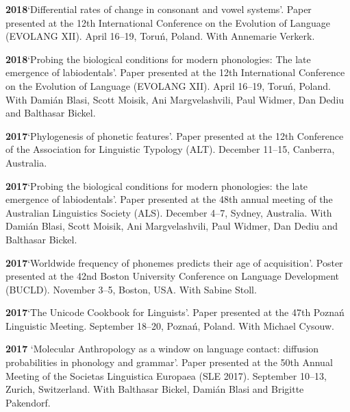 \documentclass[11pt]{article}
\newcommand{\hangpara}{
 \setlength{\parindent}{0in} %
 \hangindent=0.42in %
}
\begin{document}
\vskip 6pt
\hangpara
{\bf 2018}\hspace{1ex}`Differential rates of change in consonant and vowel systems'. Paper presented at the 12th International Conference on the Evolution of Language (EVOLANG XII). April 16--19, Toru{\'n}, Poland. With Annemarie Verkerk. %

\vskip 6pt
\hangpara
{\bf 2018}\hspace{1ex}`Probing the biological conditions for modern phonologies: The late emergence of labiodentals'. Paper presented at the 12th International Conference on the Evolution of Language (EVOLANG XII). April 16--19, Toru{\'n}, Poland. With Dami{\'a}n Blasi, Scott Moisik, Ani Margvelashvili, Paul Widmer, Dan Dediu and Balthasar Bickel.

\vskip 6pt
\hangpara
{\bf 2017}\hspace{1ex}`Phylogenesis of phonetic features'. Paper presented at the 12th Conference of the Association for Linguistic Typology (ALT). December 11--15, Canberra, Australia.

\vskip 6pt
\hangpara
{\bf 2017}\hspace{1ex}`Probing the biological conditions for modern phonologies: the late emergence of labiodentals'. Paper presented at the 48th annual meeting of the Australian Linguistics Society (ALS). December 4--7, Sydney, Australia. With Dami{\'a}n Blasi, Scott Moisik, Ani Margvelashvili, Paul Widmer, Dan Dediu and Balthasar Bickel.

\vskip 6pt
\hangpara
{\bf 2017}\hspace{1ex}`Worldwide frequency of phonemes predicts their age of acquisition'. Poster presented at the 42nd Boston University Conference on Language Development (BUCLD). November 3--5, Boston, USA. With Sabine Stoll.

\vskip 6pt
\hangpara
{\bf 2017}\hspace{1ex}`The Unicode Cookbook for Linguists'. Paper presented at the 47th Pozna{\'n} Linguistic Meeting. September 18--20, Pozna{\'n}, Poland. With Michael Cysouw. 

\vskip 6pt
\hangpara
{\bf 2017}\hspace{1ex} `Molecular Anthropology as a window on language contact: diffusion probabilities in phonology and grammar'. Paper presented at the 50th Annual Meeting of the Societas Linguistica Europaea (SLE 2017). September 10--13, Zurich, Switzerland. With Balthasar Bickel, Dami{\'a}n Blasi and Brigitte Pakendorf.
 
\end{document}
